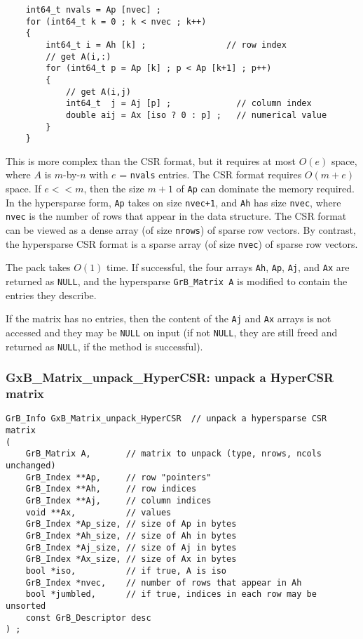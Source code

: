 \documentclass[12pt]{article}
\begin{document}
    {\footnotesize
    \begin{verbatim}
    int64_t nvals = Ap [nvec] ;
    for (int64_t k = 0 ; k < nvec ; k++)
    {
        int64_t i = Ah [k] ;                // row index
        // get A(i,:)
        for (int64_t p = Ap [k] ; p < Ap [k+1] ; p++)
        {
            // get A(i,j)
            int64_t  j = Aj [p] ;             // column index
            double aij = Ax [iso ? 0 : p] ;   // numerical value
        }
    } \end{verbatim}}

\vspace{-0.05in}
This is more complex than the CSR format, but it requires at most
$O(e)$ space, where $A$ is $m$-by-$n$ with $e$ = \verb'nvals' entries.  The
CSR format requires $O(m+e)$ space.  If $e << m$, then the size $m+1$
of \verb'Ap' can dominate the memory required.  In the hypersparse form,
\verb'Ap' takes on size \verb'nvec+1', and \verb'Ah' has size \verb'nvec',
where \verb'nvec' is the number of rows that appear in the data structure.
The CSR format can be viewed as a dense array (of size \verb'nrows')
of sparse row vectors.   By contrast, the hypersparse CSR format is a sparse
array (of size \verb'nvec') of sparse row vectors.

The pack takes $O(1)$ time.  If successful, the four arrays \verb'Ah',
\verb'Ap', \verb'Aj', and \verb'Ax' are returned as \verb'NULL', and the
hypersparse \verb'GrB_Matrix A' is modified to contain the entries
they describe.

If the matrix has no entries, then the content of the \verb'Aj' and \verb'Ax' arrays
is not accessed and they may be \verb'NULL' on input (if not \verb'NULL', they
are still freed and returned as \verb'NULL', if the method is successful).

\newpage
\subsubsection{{\sf GxB\_Matrix\_unpack\_HyperCSR:} unpack a HyperCSR matrix}
\label{matrix_unpack_hypercsr}

\begin{mdframed}[userdefinedwidth=6in]
{\footnotesize
\begin{verbatim}
GrB_Info GxB_Matrix_unpack_HyperCSR  // unpack a hypersparse CSR matrix
(
    GrB_Matrix A,       // matrix to unpack (type, nrows, ncols unchanged)
    GrB_Index **Ap,     // row "pointers"
    GrB_Index **Ah,     // row indices
    GrB_Index **Aj,     // column indices
    void **Ax,          // values
    GrB_Index *Ap_size, // size of Ap in bytes
    GrB_Index *Ah_size, // size of Ah in bytes
    GrB_Index *Aj_size, // size of Aj in bytes
    GrB_Index *Ax_size, // size of Ax in bytes
    bool *iso,          // if true, A is iso
    GrB_Index *nvec,    // number of rows that appear in Ah
    bool *jumbled,      // if true, indices in each row may be unsorted
    const GrB_Descriptor desc
) ;
\end{verbatim}
} \end{mdframed}
\end{document}
